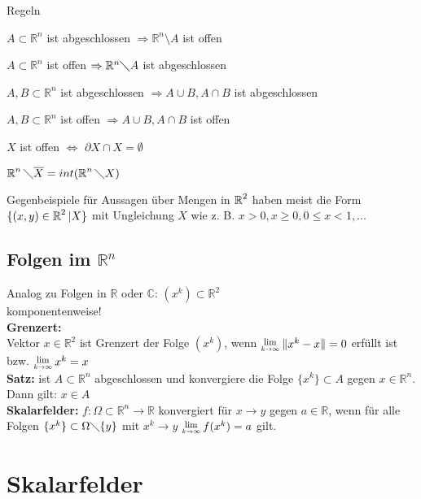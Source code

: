 \documentclass[german]{latex4ei/latex4ei_sheet}
\begin{document}
\begin{cookbox}{Regeln}
	\item $A \subset \mathbb{R}^n$ ist abgeschlossen $\Rightarrow \mathbb{R}^n \setminus A$ ist offen
	\item $A \subset \mathbb{R}^n$ ist offen $\Rightarrow \mathbb{R}^n \diagdown A$ ist abgeschlossen
	\item $A,B \subset \mathbb{R}^n$ ist abgeschlossen $\Rightarrow A \cup B, A \cap B$ ist abgeschlossen
	\item $A,B \subset \mathbb{R}^n$ ist offen $\Rightarrow A \cup B, A \cap B$ ist offen
	\item $X$ ist offen $\Leftrightarrow$ $\partial X \cap X = \emptyset$
	\item $\operatorname{\mathbb R}^n \diagdown \overline{X}=int(\operatorname{\mathbb R}^n \diagdown X)$
\end{cookbox}

Gegenbeispiele f\"ur Aussagen \"uber Mengen in $\operatorname{\mathbb R}^2$ haben meist die Form $\{(x,y)\in\operatorname{\mathbb R}^2 | X \}$ mit Ungleichung $X$ wie z. B. $x>0,x\ge0,0\le x < 1,...$

\begin{sectionbox}
	\subsection*{Folgen im $\mathbb{R}^n$}
	Analog zu Folgen in $\mathbb{R}$ oder $\mathbb{C}$: $(x^k) \subset \mathbb{R}^2$\\
	komponentenweise!\\
	\textbf{Grenzert:}\\
	Vektor $x \in \mathbb{R}^2$ ist Grenzert der Folge $(x^k)$, wenn $\Lim{k \to \infty} \|x^k -x\| = 0$ erfüllt ist bzw. $\Lim{k \to \infty} x^k = x$\\
	\textbf{Satz:} ist $A \subset \mathbb{R}^n$ abgeschlossen und konvergiere die Folge $\{x^k\} \subset A$ gegen $x \in \mathbb{R}^n$. Dann gilt: $x \in A$\\
	\textbf{Skalarfelder:} $f: \Omega \subset \mathbb{R}^n \rightarrow \mathbb{R}$ konvergiert für $x \to y$ gegen $a \in \mathbb{R}$, wenn f\"ur alle Folgen $\{x^k\} \subset \Omega \diagdown \{y\}$ mit $x^k \to y$ $\Lim{k \to \infty} f(x^k) = a $ gilt.
	\end{sectionbox}
\section{Skalarfelder}
\end{document}
